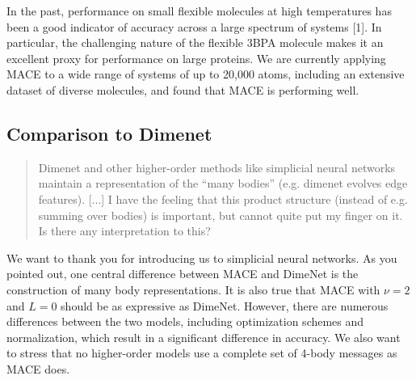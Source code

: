 \documentclass{article}
\begin{document}
In the past, performance on small flexible molecules at high temperatures has been a good indicator of accuracy across a large spectrum of systems [1].
In particular, the challenging nature of the flexible 3BPA molecule makes it an excellent proxy for performance on large proteins.
We are currently applying MACE to a wide range of systems of up to 20,000 atoms, including an extensive dataset of diverse molecules, and found that MACE is performing well. 


\subsection*{Comparison to Dimenet}


\begin{quote}
Dimenet and other higher-order methods like simplicial neural networks maintain a representation of the “many bodies” (e.g. dimenet evolves edge features). [...] I have the feeling that this product structure (instead of e.g. summing over bodies) is important, but cannot quite put my finger on it.  Is there any interpretation to this?
\end{quote}

We want to thank you for introducing us to simplicial neural networks.
As you pointed out, one central difference between MACE and DimeNet is the construction of many body representations.
It is also true that MACE with $\nu=2$ and $L=0$ should be as expressive as DimeNet.
However, there are numerous differences between the two models, including optimization schemes and normalization, which result in a significant difference in accuracy.
We also want to stress that no higher-order models use a complete set of 4-body messages as MACE does.
\end{document}
